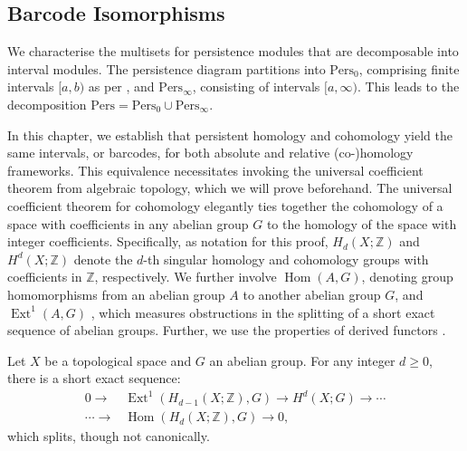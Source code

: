 \subsection{Barcode Isomorphisms}
\label{BarcodeIsomorphisms}
We characterise the multisets for persistence modules that are decomposable into
interval modules. The persistence diagram partitions into $\mathrm{Pers}_{0}$,
comprising finite intervals $[a, b)$ as per \cite[\S 2.3]{de2011dualities}, and $\mathrm{Pers}_{\infty}$, consisting of intervals $[a, \infty)$. This leads to the decomposition
$\mathrm{Pers}= \mathrm{Pers}_{0} \cup \mathrm{Pers}_{\infty}$.

In this chapter, we establish that persistent homology and cohomology yield the
same intervals, or barcodes, for both absolute and relative (co-)homology
frameworks. This equivalence necessitates invoking the universal coefficient theorem
from algebraic topology, which we will prove beforehand. The universal coefficient
theorem for cohomology elegantly ties together the cohomology of a space with coefficients
in any abelian group $G$ to the homology of the space with integer coefficients. Specifically, as notation for this proof, $H_{d}(X;\mathbb{Z})$ and
$H^{d}(X;\mathbb{Z})$ denote the $d$-th singular homology and cohomology groups
with coefficients in $\mathbb{Z}$, respectively. We further involve
$\operatorname{Hom}(A, G)$, denoting group homomorphisms from an abelian group $A$ to another
abelian group $G$, and $\operatorname{Ext}^{1}(A, G)$ \cite[\S 3.1, p. 195]{hatcher2005algebraic}, which measures obstructions
in the splitting of a short exact sequence of abelian groups. Further, we use the
properties of derived functors \cite[\S 2.7]{Weibel1994}.

\begin{theorem}{\cite[Theorem 3.2]{hatcher2005algebraic}}
\label{UniversalCoefficientsforCohomology}
Let $X$ be a topological space and $G$ an abelian group. For any integer $d \geq 0$, there is a short exact sequence:
\begin{align}
0 \rightarrow &\operatorname{Ext}^{1}(H_{d-1}(X;\mathbb{Z}), G) \rightarrow H^{d}(X; G) \rightarrow \cdots \\
\cdots \rightarrow &\operatorname{Hom}(H_{d}(X;\mathbb{Z}), G) \rightarrow 0,
\end{align}
which splits, though not canonically.
\end{theorem}

